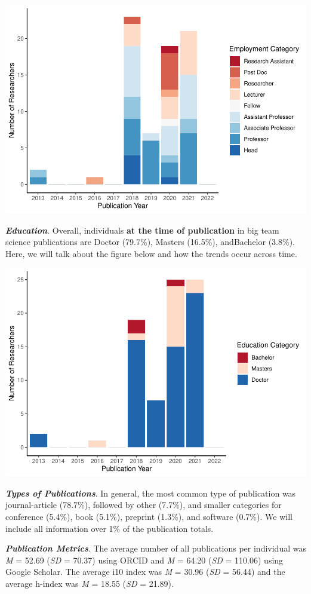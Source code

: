 \documentclass[
  english,
  man]{apa6}
\begin{document}
\includegraphics{04.manuscript_files/figure-latex/figure3-1.pdf}

\textbf{\emph{Education}}. Overall, individuals \textbf{at the time of publication} in big team science publications are Doctor (79.7\%), Masters (16.5\%), andBachelor (3.8\%). Here, we will talk about the figure below and how the trends occur across time.

\includegraphics{04.manuscript_files/figure-latex/figure4-1.pdf}

\textbf{\emph{Types of Publications}}. In general, the most common type of publication was journal-article (78.7\%), followed by other (7.7\%), and smaller categories for conference (5.4\%), book (5.1\%), preprint (1.3\%), and software (0.7\%). We will include all information over 1\% of the publication totals.

\textbf{\emph{Publication Metrics}}. The average number of all publications per individual was \emph{M} = 52.69 (\emph{SD} = 70.37) using ORCID and \emph{M} = 64.20 (\emph{SD} = 110.06) using Google Scholar. The average i10 index was \emph{M} = 30.96 (\emph{SD} = 56.44) and the average h-index was \emph{M} = 18.55 (\emph{SD} = 21.89).
\end{document}

